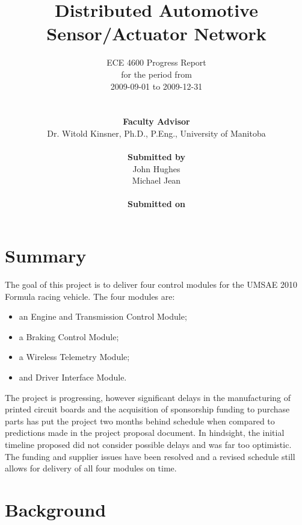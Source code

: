 \documentclass[12pt]{report}
\begin{document}
\title{Distributed Automotive Sensor/Actuator Network}
\author{
	\hline
	ECE 4600 Progress Report\\
	for the period from
	\\2009-09-01 to 2009-12-31\\
	\hline
	\\ \\
	\textbf{Faculty Advisor}\\
	Dr. Witold Kinsner, Ph.D., P.Eng., University of Manitoba\\
	\\
	\textbf{Submitted by}\\
	John Hughes\\
	Michael Jean
	\\ \\
	\textbf{Submitted on}
	\vspace{-1em}
}
\maketitle

\section{Summary}

The goal of this project is to deliver four control modules for the UMSAE 2010 Formula racing vehicle. The four modules are:
\begin{itemize}
 \item an Engine and Transmission Control Module;
 \item a Braking Control Module;
 \item a Wireless Telemetry Module;
 \item and Driver Interface Module.
\end{itemize}
The project is progressing, however significant delays in the manufacturing of printed circuit boards and the acquisition of sponsorship funding to purchase parts has put the project two months behind schedule when compared to predictions made in the project proposal document. In hindsight, the initial timeline proposed did not consider possible delays and was far too optimistic. The funding and supplier issues have been resolved and a revised schedule still allows for delivery of all four modules on time. 

\pagebreak

\section{Background}
\end{document}
